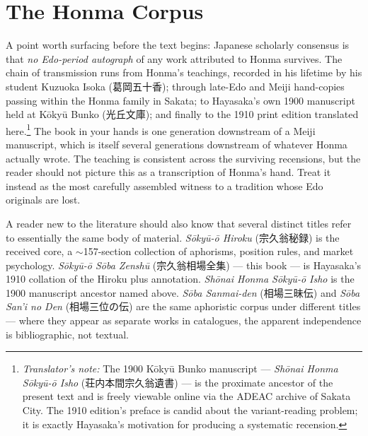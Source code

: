 \documentclass[10pt, openany]{book}
\newcommand{\jp}[1]{{\japanesefont #1}}
\newcommand{\tn}[1]{\footnote{\textit{Translator's note:} #1}}
\begin{document}
\section*{The Honma Corpus}

A point worth surfacing before the text begins: Japanese scholarly
consensus is that \emph{no Edo-period autograph} of any work
attributed to Honma survives. The chain of transmission runs from
Honma's teachings, recorded in his lifetime by his student Kuzuoka
Isoka (\jp{葛岡五十香}); through late-Edo and Meiji hand-copies passing
within the Honma family in Sakata; to Hayasaka's own 1900 manuscript
held at K\=oky\=u Bunko (\jp{光丘文庫}); and finally to the 1910 print
edition translated here.\tn{The 1900 K\=oky\=u Bunko manuscript ---
\textit{Sh\=onai Honma S\=oky\=u-\=o Isho} (\jp{荘内本間宗久翁遺書})
--- is the proximate ancestor of the present text and is freely
viewable online via the ADEAC archive of Sakata City. The 1910
edition's preface is candid about the variant-reading problem; it
is exactly Hayasaka's motivation for producing a systematic
recension.} The book in your hands is one generation downstream of a
Meiji manuscript, which is itself several generations downstream of
whatever Honma actually wrote. The teaching is consistent across
the surviving recensions, but the reader should not picture this as
a transcription of Honma's hand. Treat it instead as the most
carefully assembled witness to a tradition whose Edo originals are
lost.

A reader new to the literature should also know that several
distinct titles refer to essentially the same body of material.
\textit{S\=oky\=u-\=o Hiroku} (\jp{宗久翁秘録}) is the received core,
a $\sim$157-section collection of aphorisms, position rules, and
market psychology. \textit{S\=oky\=u-\=o S\=oba Zensh\=u}
(\jp{宗久翁相場全集}) --- this book --- is Hayasaka's 1910 collation
of the Hiroku plus annotation. \textit{Sh\=onai Honma S\=oky\=u-\=o
Isho} is the 1900 manuscript ancestor named above.
\textit{S\=oba Sanmai-den} (\jp{相場三昧伝}) and \textit{S\=oba
San'i no Den} (\jp{相場三位の伝}) are the same aphoristic corpus
under different titles --- where they appear as separate works in
catalogues, the apparent independence is bibliographic, not
textual.
\end{document}
